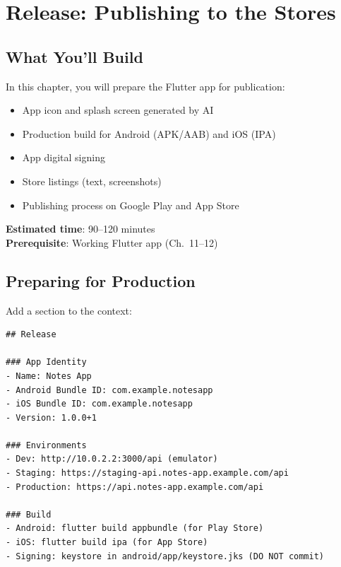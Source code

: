 \chapter{Release: Publishing to the Stores}

\section*{What You'll Build}
In this chapter, you will prepare the Flutter app for publication:
\begin{itemize}
  \item App icon and splash screen generated by AI
  \item Production build for Android (APK/AAB) and iOS (IPA)
  \item App digital signing
  \item Store listings (text, screenshots)
  \item Publishing process on Google Play and App Store
\end{itemize}

\textbf{Estimated time}: 90--120 minutes\\
\textbf{Prerequisite}: Working Flutter app (Ch.~11--12)

\section{Preparing for Production}

\begin{praticabox}[title={Hands-on --- Update \texttt{\_CONTEXT.md} for release}]
Add a section to the context:
\begin{lstlisting}[language={}]
## Release

### App Identity
- Name: Notes App
- Android Bundle ID: com.example.notesapp
- iOS Bundle ID: com.example.notesapp
- Version: 1.0.0+1

### Environments
- Dev: http://10.0.2.2:3000/api (emulator)
- Staging: https://staging-api.notes-app.example.com/api
- Production: https://api.notes-app.example.com/api

### Build
- Android: flutter build appbundle (for Play Store)
- iOS: flutter build ipa (for App Store)
- Signing: keystore in android/app/keystore.jks (DO NOT commit)
\end{lstlisting}
\end{praticabox}


